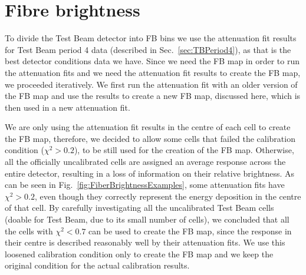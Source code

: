 


\section{Fibre brightness}\label{sec:FibreBrightnessTB}

To divide the Test Beam detector into \gls{FB} bins we use the attenuation fit results for Test Beam period 4 data (described in Sec.~\ref{sec:TBPeriod4}), as that is the best detector conditions data we have. Since we need the \gls{FB} map in order to run the attenuation fits and we need the attenuation fit results to create the \gls{FB} map, we proceeded iteratively. We first run the attenuation fit with an older version of the \gls{FB} map and use the results to create a new \gls{FB} map, discussed here, which is then used in a new attenuation fit.

We are only using the attenuation fit results in the centre of each cell to create the \gls{FB} map, therefore, we decided to allow some cells that failed the calibration condition ($\chi^2>0.2$), to be still used for the creation of the \gls{FB} map. Otherwise, all the officially uncalibrated cells are assigned an average response across the entire detector, resulting in a loss of information on their relative brightness. As can be seen in Fig.~\ref{fig:FiberBrightnessExamples}, some attenuation fits have $\chi^2>0.2$, even though they correctly represent the energy deposition in the centre of that cell. By carefully investigating all the uncalibrated Test Beam cells (doable for Test Beam, due to its small number of cells), we concluded that all the cells with $\chi^2<0.7$ can be used to create the \gls{FB} map, since the response in their centre is described reasonably well by their attenuation fits. We use this loosened calibration condition only to create the \gls{FB} map and we keep the original condition for the actual calibration results.

